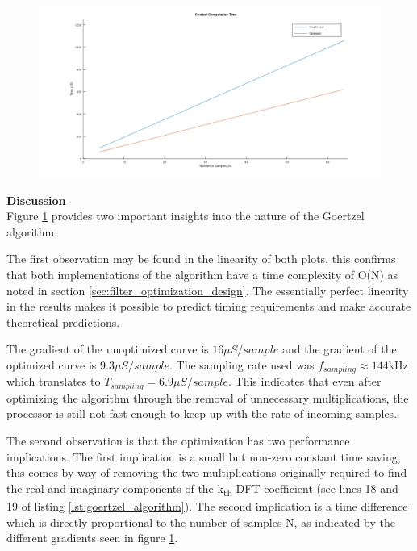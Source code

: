 \begin{figure}[H]
	\centering
	\includegraphics[width=\linewidth]{figures/results/goertzel_filter_speed/goertzel_computation_time.png}
	\label{fig:goertzel_computation_plot}
\end{figure}


\textbf{Discussion}\\
Figure \ref{fig:goertzel_computation_plot} provides two important insights into the nature of the Goertzel algorithm.

The first observation may be found in the linearity of both plots, this confirms that both implementations of the algorithm have a time complexity of O(N) as noted in section \ref{sec:filter_optimization_design}. The essentially perfect linearity in the results makes it possible to predict timing requirements and make accurate theoretical predictions.

The gradient of the unoptimized curve is $16\mu S/sample$ and the gradient of the optimized curve is $9.3\mu S/sample$. The sampling rate used was $f_{sampling} \approx 144$kHz which translates to $T_{sampling} = 6.9\mu S/sample$. This indicates that even after optimizing the algorithm through the removal of unnecessary multiplications, the processor is still not fast enough to keep up with the rate of incoming samples.

The second observation is that the optimization has two performance implications. The first implication is a small but non-zero constant time saving, this comes by way of removing the two multiplications originally required to find the real and imaginary components of the k\textsubscript{th} DFT coefficient (see lines 18 and 19 of listing \ref{lst:goertzel_algorithm}). The second implication is a time difference which is directly proportional to the number of samples N, as indicated by the different gradients seen in figure \ref{fig:goertzel_computation_plot}.


